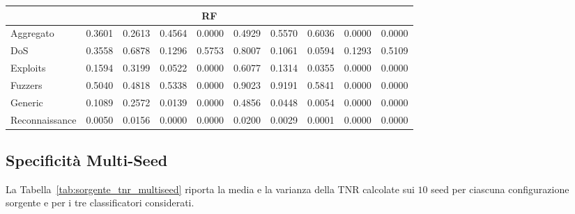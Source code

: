\begin{table}[H]
{\begin{tabular}{lccccccccc}
        \multicolumn{10}{c}{\textbf{RF}} \\
        \hline
        Aggregato      & 0.3601 & 0.2613 & 0.4564 & 0.0000 & 0.4929 & 0.5570 & 0.6036 & 0.0000 & 0.0000 \\
        DoS            & 0.3558 & 0.6878 & 0.1296 & 0.5753 & 0.8007 & 0.1061 & 0.0594 & 0.1293 & 0.5109 \\
        Exploits       & 0.1594 & 0.3199 & 0.0522 & 0.0000 & 0.6077 & 0.1314 & 0.0355 & 0.0000 & 0.0000 \\
        Fuzzers        & 0.5040 & 0.4818 & 0.5338 & 0.0000 & 0.9023 & 0.9191 & 0.5841 & 0.0000 & 0.0000 \\
        Generic        & 0.1089 & 0.2572 & 0.0139 & 0.0000 & 0.4856 & 0.0448 & 0.0054 & 0.0000 & 0.0000 \\
        Reconnaissance & 0.0050 & 0.0156 & 0.0000 & 0.0000 & 0.0200 & 0.0029 & 0.0001 & 0.0000 & 0.0000 \\
        \bottomrule
    \end{tabular}
    }
\end{table}


\subsection{Specificità Multi-Seed}

La Tabella~\ref{tab:sorgente_tnr_multiseed} riporta la media e la varianza della TNR calcolate sui $10$ seed per ciascuna configurazione sorgente e per i tre classificatori considerati.


